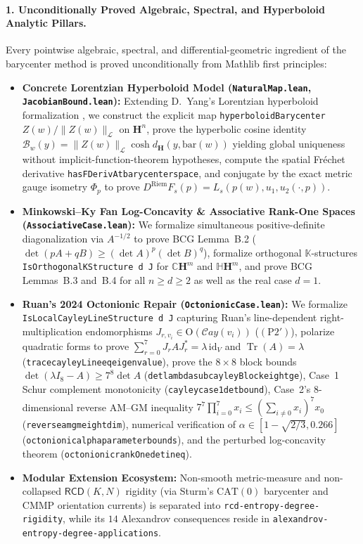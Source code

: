 \documentclass[10pt]{article}
\renewcommand{\_}{\origus\allowbreak}
\newcommand{\C}{\mathbb{C}}
\newcommand{\Quat}{\mathbb{H}}
\newcommand{\Kfield}{\mathbb{K}}
\newcommand{\Hyp}{\mathbf{H}}
\newcommand{\Tr}{\operatorname{Tr}}
\newcommand{\code}[1]{\texttt{#1}}
\begin{document}
\paragraph{1. Unconditionally Proved Algebraic, Spectral, and Hyperboloid Analytic Pillars.}\sloppy
Every pointwise algebraic, spectral, and differential-geometric ingredient of the barycenter method is
proved unconditionally from Mathlib first principles:
\begin{itemize}\sloppy
\item \textbf{Concrete Lorentzian Hyperboloid Model (\code{NaturalMap.lean}, \code{JacobianBound.lean}):}
Extending D.~Yang's Lorentzian hyperboloid formalization \cite{YangDG}, we construct the explicit map
\code{hyperboloidBarycenter} $Z(w)/\|Z(w)\|_{\mathcal{L}}$ on $\Hyp^n$, prove the hyperbolic
cosine identity $\mathcal{B}_w(y) = \|Z(w)\|_{\mathcal{L}}\cosh d_{\Hyp}(y, \mathrm{bar}(w))$ yielding
global uniqueness without implicit-function-theorem hypotheses, compute the spatial Fr\'echet derivative
\code{hasFDerivAt\_barycenter\_space}, and conjugate by the exact metric gauge isometry $\Phi_p$ to prove
$D^{\mathrm{Riem}} F_s(p) = L_s(p(w), u_1, u_2(\cdot, p))$.
\item \textbf{Minkowski--Ky Fan Log-Concavity \& Associative Rank-One Spaces (\code{AssociativeCase.lean}):}
We formalize simultaneous positive-definite diagonalization via $A^{-1/2}$ to prove BCG Lemma~B.2
($\det(pA + qB) \ge (\det A)^p(\det B)^q$), formalize orthogonal $\Kfield$-structures
\code{IsOrthogonalKStructure d J} for $\C\Hyp^m$ and $\Quat\Hyp^m$, and prove BCG Lemmas~B.3 and~B.4 for
all $n \ge d \ge 2$ as well as the real case $d = 1$.
\item \textbf{Ruan's 2024 Octonionic Repair (\code{OctonionicCase.lean}):}
We formalize \code{IsLocalCayleyLineStructure d J} capturing Ruan's line-dependent right-multiplication
endomorphisms $J_{r,v_i} \in \mathrm{O}(\mathcal{C}ay(v_i))$ ($\mathrm{(P2')}$), polarize quadratic forms
to prove $\sum_{r=0}^7 J_r A J_r^* = \lambda\,\mathrm{id}_V$ and $\Tr(A) = \lambda$
(\code{trace\_cayleyLine\_eq\_eigenvalue}), prove the $8\times 8$ block bounds
$\det(\lambda I_8 - A) \ge 7^8 \det A$ (\code{det\_lambda\_sub\_cayleyBlock\_eight\_ge}), Case~1 Schur
complement monotonicity (\code{cayley\_case1\_det\_bound}), Case~2's $8$-dimensional reverse AM--GM
inequality $7^7 \prod_{i=0}^7 x_i \le (\sum_{i\ne 0} x_i)^7 x_0$ (\code{reverse\_amgm\_eight\_dim}),
numerical verification of $\alpha \in [1-\sqrt{2/3}, 0.266]$ (\code{octonionic\_alpha\_parameter\_bounds}),
and the perturbed log-concavity theorem (\code{octonionic\_rankOne\_det\_ineq}).
\item \textbf{Modular Extension Ecosystem:} Non-smooth metric-measure and non-collapsed $\mathsf{RCD}(K, N)$
rigidity (via Sturm's $\mathrm{CAT}(0)$ barycenter and CMMP orientation currents) is separated into
\code{rcd-entropy-degree-rigidity}, while its $14$ Alexandrov consequences reside in
\code{alexandrov-entropy-degree-applications}.
\end{itemize}
\end{document}

